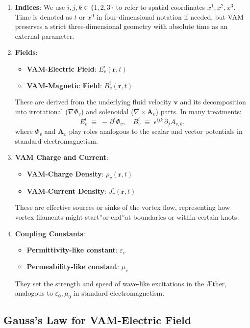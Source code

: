 \documentclass[a4paper,12pt]{article}
\begin{document}
\begin{enumerate}
    \item \textbf{Indices}: We use \(i, j, k \in \{1,2,3\}\) to refer to spatial coordinates \(x^1, x^2, x^3\). Time is denoted as \(t\) or \(x^0\) in four-dimensional notation if needed, but VAM preserves a strict three-dimensional geometry with absolute time as an external parameter.
    \item \textbf{Fields}:
    \begin{itemize}
        \item \textbf{VAM-Electric Field}: \(E_{v}^i(\mathbf{r}, t)\)
        \item \textbf{VAM-Magnetic Field}: \(B_{v}^i(\mathbf{r}, t)\)
    \end{itemize}
    These are derived from the underlying fluid velocity \(\mathbf{v}\) and its decomposition into irrotational (\(\nabla \Phi_v\)) and solenoidal (\(\nabla \times \mathbf{A}_v\)) parts. In many treatments:
    \[
        E_{v}^i \;\equiv\; -\,\partial^i \Phi_v,
        \quad
        B_{v}^i \;\equiv\; \epsilon^{ijk}\,\partial_j A_{v,k},
    \]
    where \(\Phi_v\) and \(\mathbf{A}_v\) play roles analogous to the scalar and vector potentials in standard electromagnetism.
    \item \textbf{VAM Charge and Current}:
    \begin{itemize}
        \item \textbf{VAM-Charge Density}: \(\rho_v(\mathbf{r}, t)\)
        \item \textbf{VAM-Current Density}: \(J_{v}^i(\mathbf{r}, t)\)
    \end{itemize}
    These are effective sources or sinks of the vortex flow, representing how vortex filaments might \grqq start\textquotedblright or \grqq end\textquotedblright at boundaries or within certain knots.
    \item \textbf{Coupling Constants}:
    \begin{itemize}
        \item \textbf{Permittivity-like constant}: \(\varepsilon_v\)
        \item \textbf{Permeability-like constant}: \(\mu_v\)
    \end{itemize}
    They set the strength and speed of wave-like excitations in the Æther, analogous to \(\varepsilon_0, \mu_0\) in standard electromagnetism.
\end{enumerate}

\subsection{Gauss's Law for VAM-Electric Field}
\end{document}
